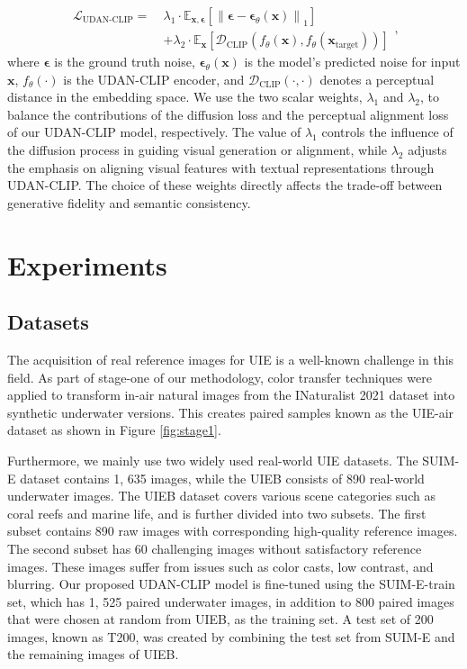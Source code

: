 \documentclass[3p,12pt,authoryear]{elsarticle}
\begin{document}
\begin{equation}
\label{200}
\begin{split}
\mathcal{L}_{\text{UDAN-CLIP}} =\ & 
\lambda_1 \cdot \mathbb{E}_{\mathbf{x}, \boldsymbol{\epsilon}} \left[ 
\left\lVert \boldsymbol{\epsilon} - \boldsymbol{\epsilon}_\theta(\mathbf{x}) \right\rVert_1 
\right] \\
& + \lambda_2 \cdot \mathbb{E}_{\mathbf{x}} \left[ 
\mathcal{D}_{\text{CLIP}} \left( f_\theta(\mathbf{x}), f_\theta(\mathbf{x}_{\text{target}}) \right) 
\right]
\end{split},
\end{equation}
\noindent
where $\boldsymbol{\epsilon}$ is the ground truth noise, $\boldsymbol{\epsilon}_\theta(\mathbf{x})$ is the model's predicted noise for input $\mathbf{x}$, $f_\theta(\cdot)$ is the UDAN-CLIP encoder, and $\mathcal{D}_{\text{CLIP}}(\cdot, \cdot)$ denotes a perceptual distance in the embedding space. We use the two scalar weights, $\lambda_1$ and $\lambda_2$, to balance the contributions of the diffusion loss and the perceptual alignment loss of our UDAN-CLIP model, respectively. The value of $\lambda_1$ controls the influence of the diffusion process in guiding visual generation or alignment, while $\lambda_2$ adjusts the emphasis on aligning visual features with textual representations through UDAN-CLIP. The choice of these weights directly affects the trade-off between generative fidelity and semantic consistency.

\section{Experiments}
\subsection{Datasets}

The acquisition of real reference images for UIE is a well-known challenge in this field. As part of stage-one of our methodology, color transfer techniques were applied to transform in-air natural images from the INaturalist 2021 dataset \cite{8579012} into synthetic underwater versions. This creates paired samples known as the UIE-air dataset as shown in Figure \ref{fig:stage1}.

Furthermore, we mainly use two widely used real-world UIE datasets. The SUIM-E \cite{9930878} dataset contains 1, 635 images, while the UIEB \cite{8917818} consists of 890 real-world underwater images. The UIEB dataset covers various scene categories such as coral reefs and marine life, and is further divided into two subsets. The first subset contains 890 raw images with corresponding high-quality reference images. The second subset has 60 challenging images without satisfactory reference images. These images suffer from issues such as color casts, low contrast, and blurring. Our proposed UDAN-CLIP model is fine-tuned using the SUIM-E-train set, which has 1, 525 paired underwater images, in addition to 800 paired images that were chosen at random from UIEB, as the training set. A test set of 200 images, known as T200, was created by combining the test set from SUIM-E and the remaining images of UIEB.
\end{document}
